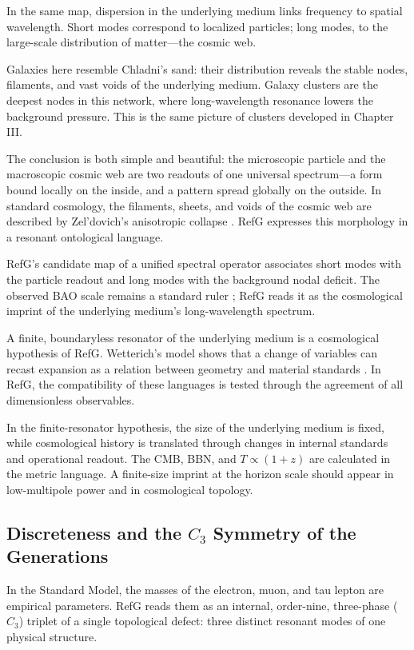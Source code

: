\documentclass[11pt,a4paper]{article}
\begin{document}
In the same map, dispersion in the underlying medium links frequency to spatial wavelength. Short modes correspond to localized particles; long modes, to the large-scale distribution of matter---the cosmic web.

Galaxies here resemble Chladni's sand: their distribution reveals the stable nodes, filaments, and vast voids of the underlying medium. Galaxy clusters are the deepest nodes in this network, where long-wavelength resonance lowers the background pressure. This is the same picture of clusters developed in Chapter III.

The conclusion is both simple and beautiful: the microscopic particle and the macroscopic cosmic web are two readouts of one universal spectrum---a form bound locally on the inside, and a pattern spread globally on the outside. In standard cosmology, the filaments, sheets, and voids of the cosmic web are described by Zel'dovich's anisotropic collapse \citep{zeldovich1970}. RefG expresses this morphology in a resonant ontological language.

RefG's candidate map of a unified spectral operator associates short modes with the particle readout and long modes with the background nodal deficit. The observed BAO scale remains a standard ruler \citep{eisenstein2005}; RefG reads it as the cosmological imprint of the underlying medium's long-wavelength spectrum.

A finite, boundaryless resonator of the underlying medium is a cosmological hypothesis of RefG. Wetterich's model shows that a change of variables can recast expansion as a relation between geometry and material standards \citep{wetterich2013}. In RefG, the compatibility of these languages is tested through the agreement of all dimensionless observables.

In the finite-resonator hypothesis, the size of the underlying medium is fixed, while cosmological history is translated through changes in internal standards and operational readout. The CMB, BBN, and $T\propto(1+z)$ are calculated in the metric language. A finite-size imprint at the horizon scale should appear in low-multipole power and in cosmological topology.

\subsection{Discreteness and the \texorpdfstring{$C_3$}{C3} Symmetry of the Generations}

In the Standard Model, the masses of the electron, muon, and tau lepton are empirical parameters. RefG reads them as an internal, order-nine, three-phase ($C_3$) triplet of a single topological defect: three distinct resonant modes of one physical structure.
\end{document}
